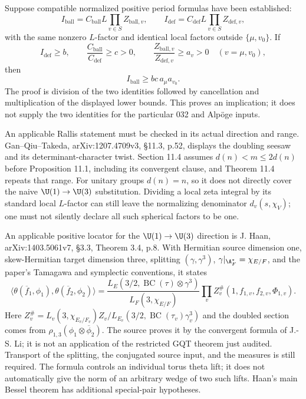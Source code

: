 Suppose compatible normalized positive period formulas have been established:
\[
 I_{\mathrm{ball}}=C_{\mathrm{ball}}L\prod_{v\in S}Z_{\mathrm{ball},v},
 \qquad
 I_{\mathrm{def}}=C_{\mathrm{def}}L\prod_{v\in S}Z_{\mathrm{def},v},
\]
with the same nonzero $L$-factor and identical local factors outside
$\{\mu,v_0\}$. If
\[
 I_{\mathrm{def}}\geq b,\qquad
 \frac{C_{\mathrm{ball}}}{C_{\mathrm{def}}}\geq c>0,
 \qquad \frac{Z_{\mathrm{ball},v}}{Z_{\mathrm{def},v}}\geq a_v>0
 \quad(v=\mu,v_0),
\]
then
\[
 I_{\mathrm{ball}}\geq bc\,a_\mu a_{v_0}.
\]
The proof is division of the two identities followed by cancellation and multiplication of the displayed lower bounds. This proves an implication; it does not supply the two identities for the particular 032 and Alp\"oge inputs.

An applicable Rallis statement must be checked in its actual direction and range. Gan--Qiu--Takeda, arXiv:1207.4709v3, \S11.3, p.52, displays the doubling seesaw and its determinant-character twist. Section 11.4 assumes $d(n)<m\leq2d(n)$ before Proposition 11.1, including its convergent clause, and Theorem 11.4 repeats that range. For unitary groups $d(n)=n$, so it does not directly cover the naive $\U(1)\to\U(3)$ substitution. Dividing a local zeta integral by its standard local $L$-factor can still leave the normalizing denominator $d_v(s,\chi_V)$; one must not silently declare all such spherical factors to be one.

An applicable positive locator for the $\U(1)\to\U(3)$ direction is J. Haan, arXiv:1403.5061v7, \S3.3, Theorem 3.4, p.8. With Hermitian source dimension one, skew-Hermitian target dimension three, splitting $(\gamma,\gamma^3)$, $\gamma|_{\A_F^*}=\chi_{E/F}$, and the paper's Tamagawa and symplectic conventions, it states
\[
 \langle\theta(\overline f_1,\phi_1),\theta(\overline f_2,\phi_2)\rangle
 =\frac{L_E(3/2,\operatorname{BC}(\tau)\otimes\gamma^3)}
        {L_F(3,\chi_{E/F})}
   \prod_v Z_v^{\#}(1,f_{1,v},f_{2,v},\Phi_{1,v}).
\]
Here $Z_v^{\#}=L_v(3,\chi_{E_v/F_v})Z_v/L_{E_v}(3/2,\operatorname{BC}(\tau_v)\gamma_v^3)$ and the doubled section comes from $\rho_{1,3}(\phi_1\otimes\overline\phi_2)$. The source proves it by the convergent formula of J.-S. Li; it is not an application of the restricted GQT theorem just audited. Transport of the splitting, the conjugated source input, and the measures is still required. The formula controls an individual torus theta lift; it does not automatically give the norm of an arbitrary wedge of two such lifts. Haan's main Bessel theorem has additional special-pair hypotheses.

